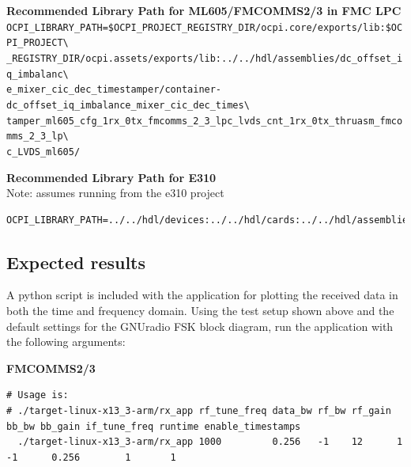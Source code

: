 \noindent\textbf{Recommended Library Path for ML605/FMCOMMS2/3 in FMC LPC}\\

\noindent
\verb|OCPI_LIBRARY_PATH=$OCPI_PROJECT_REGISTRY_DIR/ocpi.core/exports/lib:$OCPI_PROJECT\| \\
\verb|_REGISTRY_DIR/ocpi.assets/exports/lib:../../hdl/assemblies/dc_offset_iq_imbalanc\| \\
\verb|e_mixer_cic_dec_timestamper/container-dc_offset_iq_imbalance_mixer_cic_dec_times\| \\
\verb|tamper_ml605_cfg_1rx_0tx_fmcomms_2_3_lpc_lvds_cnt_1rx_0tx_thruasm_fmcomms_2_3_lp\| \\
\verb|c_LVDS_ml605/|
\par\medskip

\noindent\textbf{Recommended Library Path for E310}\\
Note: assumes running from the e310 project
\noindent
\begin{verbatim}
OCPI_LIBRARY_PATH=../../hdl/devices:../../hdl/cards:../../hdl/assemblies:$OCPI_LIBRARY_PATH
\end{verbatim}
\par\medskip
\pagebreak
\subsection{Expected results}
\noindent A python script is included with the application for plotting the received data in both the time and frequency domain. Using the test setup shown above and the default settings for the GNUradio FSK block diagram, run the application with the following arguments:\par\medskip

\small
\noindent\textbf{FMCOMMS2/3}
\scriptsize
\begin{verbatim}
# Usage is:
# ./target-linux-x13_3-arm/rx_app rf_tune_freq data_bw rf_bw rf_gain bb_bw bb_gain if_tune_freq runtime enable_timestamps
  ./target-linux-x13_3-arm/rx_app 1000         0.256   -1    12      1     -1      0.256        1       1
\end{verbatim}
\par\medskip
\small

